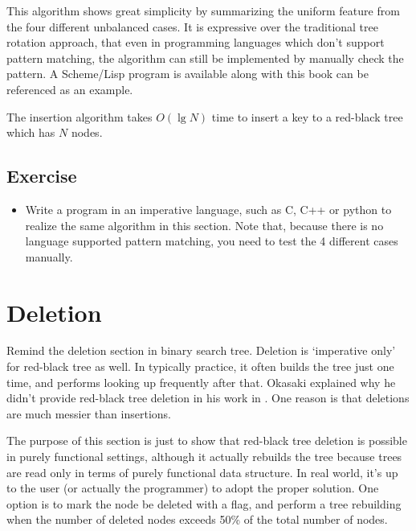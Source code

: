 \documentclass{article}
\begin{document}
This algorithm shows great simplicity by summarizing the uniform feature
from the four different unbalanced cases. It is expressive over
the traditional tree rotation approach, that even in programming languages
which don't support pattern matching, the algorithm can still be
implemented by manually check the pattern. A Scheme/Lisp program
is available along with this book can be referenced as an example.

The insertion algorithm takes $O(\lg N)$ time to insert a key to
a red-black tree which has $N$ nodes.

\subsection*{Exercise}

\begin{itemize}
\item Write a program in an imperative language, such as
C, C++ or python to realize the same algorithm in this
section. Note that, because there is no language supported
pattern matching, you need to test the 4 different cases
manually.
\end{itemize}


\section{Deletion}

Remind the deletion section in binary search tree. Deletion is 
`imperative only' for red-black tree as well. In typically
practice, it often builds the tree just one time, and 
performs looking up frequently after that. Okasaki explained
why he didn't provide red-black tree deletion in his work
in \cite{okasaki-blog}. One reason is that deletions are
much messier than insertions.

The purpose of this section is just to show that red-black
tree deletion is possible in purely functional settings, 
although it actually rebuilds the tree because trees are
read only in terms of purely functional data structure.
In real world, it's up to the user (or actually the 
programmer) to adopt the proper solution. One option is to mark
the node be deleted with a flag, and perform a tree rebuilding
when the number of deleted nodes exceeds 50\% of the total number
of nodes.
\end{document}
